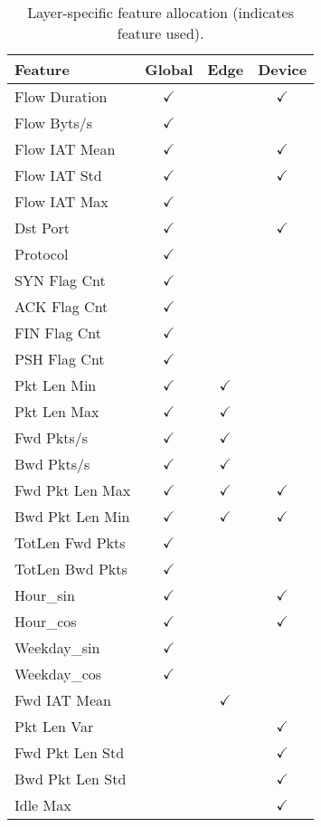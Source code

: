 \documentclass[conference]{IEEEtran}
\begin{document}
\begin{table}[htbp]
\caption{Layer-specific feature allocation (\checkmark indicates feature used).}
\centering
\small
\begin{tabular}{|l|c|c|c|}
\hline
Feature & Global & Edge & Device \\
\hline
Flow Duration & $\checkmark$ &  & $\checkmark$ \\
Flow Byts/s & $\checkmark$ &  &  \\
Flow IAT Mean & $\checkmark$ &  & $\checkmark$ \\
Flow IAT Std & $\checkmark$ &  & $\checkmark$ \\
Flow IAT Max & $\checkmark$ &  &  \\
Dst Port & $\checkmark$ &  & $\checkmark$ \\
Protocol & $\checkmark$ &  &  \\
SYN Flag Cnt & $\checkmark$ &  &  \\
ACK Flag Cnt & $\checkmark$ &  &  \\
FIN Flag Cnt & $\checkmark$ &  &  \\
PSH Flag Cnt & $\checkmark$ &  &  \\
Pkt Len Min & $\checkmark$ & $\checkmark$ &  \\
Pkt Len Max & $\checkmark$ & $\checkmark$ &  \\
Fwd Pkts/s & $\checkmark$ & $\checkmark$ &  \\
Bwd Pkts/s & $\checkmark$ & $\checkmark$ &  \\
Fwd Pkt Len Max & $\checkmark$ & $\checkmark$ & $\checkmark$ \\
Bwd Pkt Len Min & $\checkmark$ & $\checkmark$ & $\checkmark$ \\
TotLen Fwd Pkts & $\checkmark$ &  &  \\
TotLen Bwd Pkts & $\checkmark$ &  &  \\
Hour\_sin & $\checkmark$ &  & $\checkmark$ \\
Hour\_cos & $\checkmark$ &  & $\checkmark$ \\
Weekday\_sin & $\checkmark$ &  &  \\
Weekday\_cos & $\checkmark$ &  &  \\
Fwd IAT Mean &  & $\checkmark$ &  \\
Pkt Len Var &  &  & $\checkmark$ \\
Fwd Pkt Len Std &  &  & $\checkmark$ \\
Bwd Pkt Len Std &  &  & $\checkmark$ \\
Idle Max &  &  & $\checkmark$ \\

\end{tabular}
\end{table}
\end{document}
